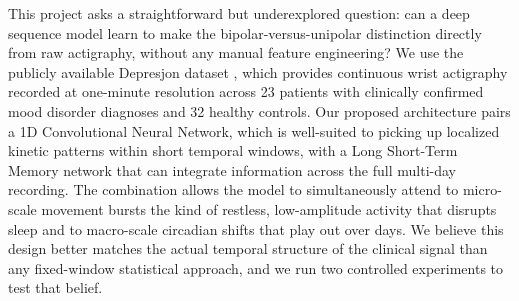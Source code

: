 This project asks a straightforward but underexplored question: can a deep sequence model learn to make the bipolar-versus-unipolar distinction directly from raw actigraphy, without any manual feature engineering? We use the publicly available Depresjon dataset \cite{garcia2018depresjon}, which provides continuous wrist actigraphy recorded at one-minute resolution across 23 patients with clinically confirmed mood disorder diagnoses and 32 healthy controls. Our proposed architecture pairs a 1D Convolutional Neural Network, which is well-suited to picking up localized kinetic patterns within short temporal windows, with a Long Short-Term Memory network that can integrate information across the full multi-day recording. The combination allows the model to simultaneously attend to micro-scale movement bursts the kind of restless, low-amplitude activity that disrupts sleep and to macro-scale circadian shifts that play out over days. We believe this design better matches the actual temporal structure of the clinical signal than any fixed-window statistical approach, and we run two controlled experiments to test that belief.

\section*{}
